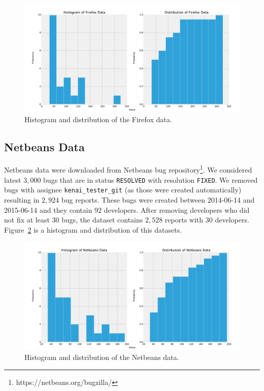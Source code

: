 \begin{figure}[htbp]
    \centering
        \includegraphics[width=\textwidth]{./images/distribution/firefox.pdf}
    \caption{Histogram and distribution of the Firefox data.}
    \label{fig:datasets.firefox.dist}
\end{figure}

\subsection{Netbeans Data}

Netbeans data were downloaded from Netbeans bug repository\footnote{https://netbeans.org/bugzilla/}. We considered latest $3,000$ bugs that are in status \texttt{RESOLVED} with resolution \texttt{FIXED}. We removed bugs with assignee \texttt{kenai\_tester\_git} (as those were created automatically) resulting in $2,924$ bug reports. These bugs were created between 2014-06-14 and 2015-06-14 and they contain $92$ developers. After removing developers who did not fix at least 30 bugs, the dataset contains $2,528$ reports with $30$ developers. Figure~\ref{fig:datasets.netbeans.dist} is a histogram and distribution of this datasets.

\begin{figure}[htbp]
    \centering
        \includegraphics[width=\textwidth]{./images/distribution/netbeans.pdf}
    \caption{Histogram and distribution of the Netbeans data.}
    \label{fig:datasets.netbeans.dist}
\end{figure}

